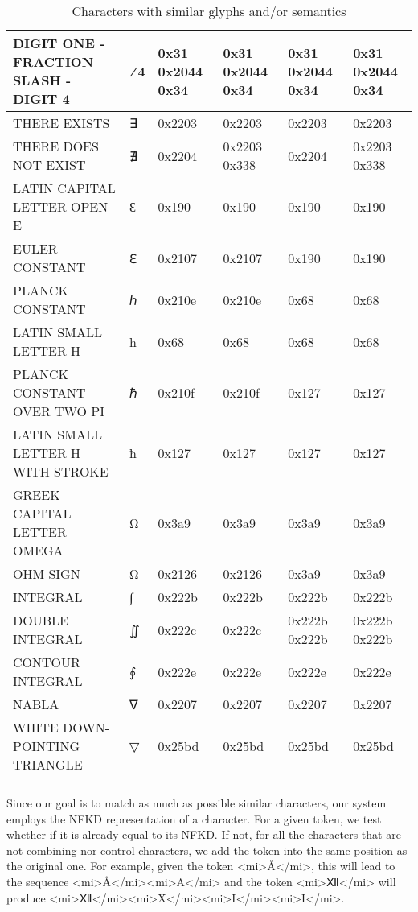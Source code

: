 \begin{longtable}{|m{4cm}|>{\centering\arraybackslash}m{2.15cm}|>{\centering\arraybackslash}m{1.65cm}|>{\centering\arraybackslash}m{1.65cm}|>{\centering\arraybackslash}m{1.65cm}|>{\centering\arraybackslash}m{1.65cm}|}
\hline
DIGIT ONE - FRACTION SLASH - DIGIT 4 & 1⁄4 &	0x31 0x2044 0x34 &	0x31 0x2044 0x34 &	0x31 0x2044 0x34 &	0x31 0x2044 0x34 \\
\hline
THERE EXISTS	& {\unicodefont ∃}&	0x2203 &	0x2203 &	0x2203 &	0x2203 \\
\hline
THERE DOES NOT EXIST	& {\unicodefont ∄} & 	0x2204	& 0x2203 0x338& 	0x2204 &	0x2203 0x338\\
\hline
LATIN CAPITAL LETTER OPEN E	& {\unicodefont Ɛ} &	0x190 &	0x190 &	0x190 &	0x190 \\
\hline
EULER CONSTANT	& {\unicodefont ℇ} & 0x2107 & 0x2107 & 0x190 & 0x190 \\
\hline
PLANCK CONSTANT	& {\unicodefont ℎ} &	0x210e &	0x210e &	0x68 &	0x68 \\
\hline
LATIN SMALL LETTER H &	h &	0x68 &	0x68 &	0x68 &	0x68 \\
\hline
PLANCK CONSTANT OVER TWO PI	& {\unicodefont ℏ} &	0x210f &	0x210f	& 0x127 &	0x127 \\
\hline
LATIN SMALL LETTER H WITH STROKE & ħ &	0x127	& 0x127	& 0x127	& 0x127 \\
\hline
GREEK CAPITAL LETTER OMEGA	& Ω &	0x3a9 &	0x3a9 &	0x3a9 &	0x3a9 \\
\hline
OHM SIGN & Ω &	0x2126 &	0x2126 &	0x3a9 &	0x3a9 \\
\hline
INTEGRAL & {\unicodefont ∫} &	0x222b &	0x222b &	0x222b &	0x222b \\
\hline
DOUBLE INTEGRAL	& {\unicodefont ∬} & 	0x222c &	0x222c &	0x222b 0x222b &	0x222b 0x222b \\
\hline
CONTOUR INTEGRAL	& {\unicodefont ∮} &	0x222e	 &0x222e &	0x222e &	0x222e \\
\hline
NABLA	& {\unicodefont ∇} &	0x2207	 &0x2207 &	0x2207 &	0x2207 \\
\hline
WHITE DOWN-POINTING TRIANGLE	& {\unicodefont ▽} &	0x25bd	 &0x25bd &	0x25bd &	0x25bd \\
\hline

\caption{Characters with similar glyphs and/or semantics}
\label{unicode_characters}
\end{longtable}


Since our goal is to match as much as possible similar characters, our system employs the NFKD representation of a character. For a given token, we test whether if it is already equal to its NFKD. If not, for all the characters that are not combining nor control characters, we add the token into the same position as the original one.
For example, given the token <mi>\r{A}</mi>, this will lead to the sequence <mi>\r{A}</mi><mi>A</mi> and the token <mi>{\unicodefontⅫ}</mi> will produce <mi>{\unicodefontⅫ}</mi><mi>X</mi><mi>I</mi><mi>I</mi>.


